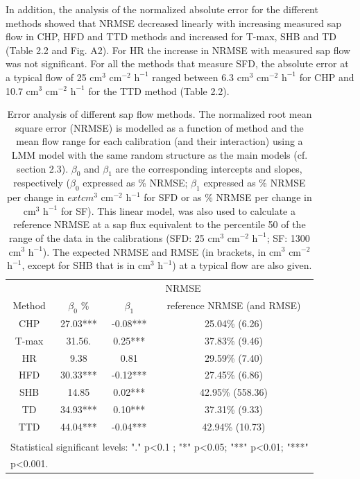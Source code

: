 \documentclass[11pt,twoside]{reedthesis}
\begin{document}
In addition, the analysis of the normalized absolute error for the
different methods showed that NRMSE decreased linearly with increasing
measured sap flow in CHP, HFD and TTD methods and increased for T-max,
SHB and TD (Table 2.2 and Fig. A2). For HR the increase in NRMSE with
measured sap flow was not significant. For all the methods that measure
SFD, the absolute error at a typical flow of 25 \(\text{cm}^3\)
\(\text{cm}^{-2}\) \(\text{h}^{-1}\) ranged between 6.3 \(\text{cm}^3\)
\(\text{cm}^{-2}\) \(\text{h}^{-1}\) for CHP and 10.7 \(\text{cm}^3\)
\(\text{cm}^{-2}\) \(\text{h}^{-1}\) for the TTD method (Table 2.2).\par
\begin{table}

\caption[Error analysis of different sap flow methods.]{\label{tab:Ch2T2}Error analysis of different sap flow methods. The normalized root mean square error (NRMSE) is modelled as a function of method and the mean flow range for each calibration (and their interaction) using a LMM model with the same random structure as the main models (cf. section 2.3). $\beta_0$ and $\beta_1$ are the corresponding intercepts and slopes, respectively ($\beta_0$ expressed as \% NRMSE; $\beta_1$ expressed as \% NRMSE per change in $    ext{cm}^3$ $\text{cm}^{-2}$ $\text{h}^{-1}$ for SFD or as \% NRMSE per change in $\text{cm}^3$ $\text{h}^{-1}$ for SF). This linear model, was also used to calculate a reference NRMSE at a sap flux equivalent to the percentile 50 of the range of the data in the calibrations (SFD: 25 $\text{cm}^3$ $\text{cm}^{-2}$ $\text{h}^{-1}$; SF: 1300 $\text{cm}^3$ $\text{h}^{-1}$). The expected NRMSE and RMSE (in brackets, in $\text{cm}^3$ $\text{cm}^{-2}$ $\text{h}^{-1}$, except for SHB that is in $\text{cm}^3$ $\text{h}^{-1}$) at a typical flow are also given.}
\centering
\fontsize{10}{12}\selectfont
\begin{tabular}[t]{cccc}
\toprule
\multicolumn{1}{c}{ } & \multicolumn{3}{c}{NRMSE} \\
\cmidrule(l{3pt}r{3pt}){2-4}
Method & $\beta_0$\; \% & $\beta_1$ & reference NRMSE (and RMSE)\\
\midrule
CHP & 27.03*** & -0.08*** & 25.04\% (6.26)\\
T-max & 31.56. & 0.25*** & 37.83\% (9.46)\\
HR & 9.38 & 0.81 & 29.59\% (7.40)\\
HFD & 30.33*** & -0.12*** & 27.45\% (6.86)\\
SHB & 14.85 & 0.02*** & 42.95\% (558.36)\\
TD & 34.93*** & 0.10*** & 37.31\% (9.33)\\
TTD & 44.04*** & -0.04*** & 42.94\% (10.73)\\
\bottomrule
\multicolumn{4}{l}{\textsuperscript{} Statistical significant levels: "." p<0.1 ; "*" p<0.05; "**" p<0.01; "***"}\\
\multicolumn{4}{l}{p<0.001.}\\
\end{tabular}
\end{table}
\end{document}
